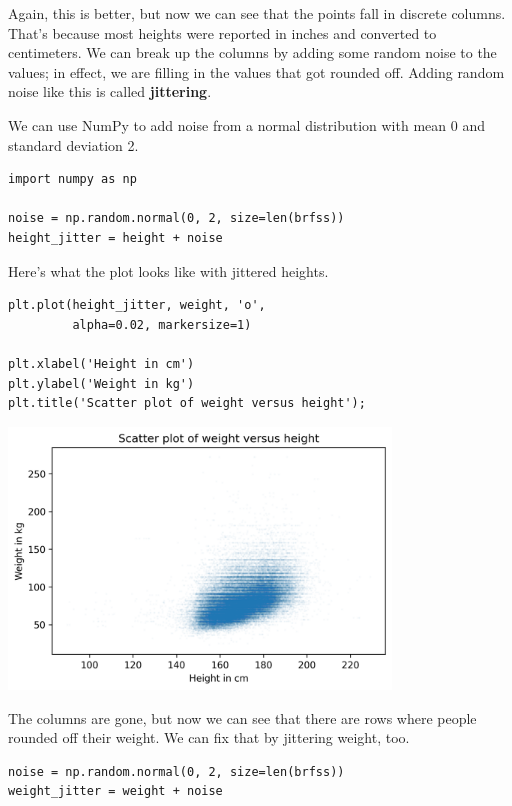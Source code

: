 Again, this is better, but now we can see that the points fall in
discrete columns. That's because most heights were reported in inches
and converted to centimeters. We can break up the columns by adding some
random noise to the values; in effect, we are filling in the values that
got rounded off. Adding random noise like this is called
\textbf{jittering}.

We can use NumPy to add noise from a normal distribution with mean 0 and
standard deviation 2.

\begin{lstlisting}[]
import numpy as np

noise = np.random.normal(0, 2, size=len(brfss))
height_jitter = height + noise
\end{lstlisting}

Here's what the plot looks like with jittered heights.

\begin{lstlisting}[]
plt.plot(height_jitter, weight, 'o', 
         alpha=0.02, markersize=1)

plt.xlabel('Height in cm')
plt.ylabel('Weight in kg')
plt.title('Scatter plot of weight versus height');
\end{lstlisting}

\begin{center}
\includegraphics[width=4in]{chapters/09_relationships_files/09_relationships_20_0.png}
\end{center}

The columns are gone, but now we can see that there are rows where
people rounded off their weight. We can fix that by jittering weight,
too.

\begin{lstlisting}[]
noise = np.random.normal(0, 2, size=len(brfss))
weight_jitter = weight + noise
\end{lstlisting}

